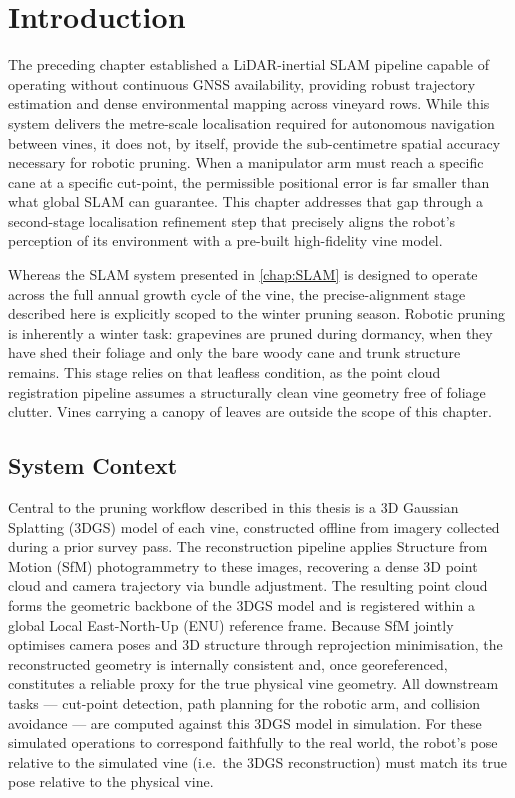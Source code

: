 \section{Introduction}
\label{sec:precise-alignment-intro}

The preceding chapter established a LiDAR-inertial SLAM pipeline capable of operating without continuous GNSS availability, providing robust trajectory estimation and dense environmental mapping across vineyard rows. While this system delivers the metre-scale localisation required for autonomous navigation between vines, it does not, by itself, provide the sub-centimetre spatial accuracy necessary for robotic pruning. When a manipulator arm must reach a specific cane at a specific cut-point, the permissible positional error is far smaller than what global SLAM can guarantee. This chapter addresses that gap through a second-stage localisation refinement step that precisely aligns the robot's perception of its environment with a pre-built high-fidelity vine model.

Whereas the SLAM system presented in \cref{chap:SLAM} is designed to operate across the full annual growth cycle of the vine, the precise-alignment stage described here is explicitly scoped to the winter pruning season. Robotic pruning is inherently a winter task: grapevines are pruned during dormancy, when they have shed their foliage and only the bare woody cane and trunk structure remains. This stage relies on that leafless condition, as the point cloud registration pipeline assumes a structurally clean vine geometry free of foliage clutter. Vines carrying a canopy of leaves are outside the scope of this chapter.

\subsection{System Context}
\label{subsec:system-context}

Central to the pruning workflow described in this thesis is a 3D Gaussian Splatting (3DGS) model of each vine, constructed offline from imagery collected during a prior survey pass. The reconstruction pipeline applies Structure from Motion (SfM) photogrammetry to these images, recovering a dense 3D point cloud and camera trajectory via bundle adjustment. The resulting point cloud forms the geometric backbone of the 3DGS model and is registered within a global Local East-North-Up (ENU) reference frame. Because SfM jointly optimises camera poses and 3D structure through reprojection minimisation, the reconstructed geometry is internally consistent and, once georeferenced, constitutes a reliable proxy for the true physical vine geometry. All downstream tasks — cut-point detection, path planning for the robotic arm, and collision avoidance — are computed against this 3DGS model in simulation. For these simulated operations to correspond faithfully to the real world, the robot's pose relative to the simulated vine (i.e.\ the 3DGS reconstruction) must match its true pose relative to the physical vine.

